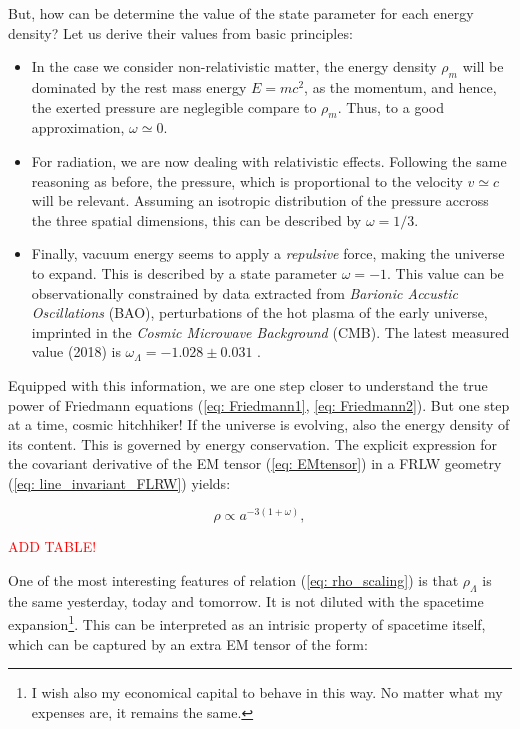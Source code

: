 \documentclass[11pt, a4paper]{article} %
\begin{document}
But, how can be determine the value of the state parameter for each energy density? Let us derive their values from basic principles:

\begin{itemize}
	\item In the case we consider non-relativistic matter, the energy density $\rho_{m}$ will be dominated by the rest mass energy $E = mc^{2}$, as the momentum, and hence, the exerted pressure are neglegible compare to $\rho_{m}$. Thus, to a good approximation, $\omega \simeq 0$.
	\item For radiation, we are now dealing with relativistic effects. Following the same reasoning as before, the pressure, which is proportional to the velocity $v \simeq c$ will be relevant. Assuming an isotropic distribution of the pressure accross the three spatial dimensions, this can be described by $\omega = 1/3$.
	\item Finally, vacuum energy seems to apply a \textit{repulsive} force, making the universe to expand. This is described by a state parameter $\omega = - 1$. This value can be observationally constrained by data extracted from \textit{Barionic Accustic Oscillations} (BAO), perturbations of the hot plasma of the early universe, imprinted in the \textit{Cosmic Microwave Background} (CMB). The latest measured value (2018) is $\omega_{\Lambda} = -1.028 \pm 0.031$ \cite{2020planck}.
\end{itemize}

Equipped with this information, we are one step closer to understand the true power of Friedmann equations (\ref{eq: Friedmann1}, \ref{eq: Friedmann2}). But one step at a time, cosmic hitchhiker! If the universe is evolving, also the energy density of its content. This is governed by energy conservation. The explicit expression for the covariant derivative of the EM tensor (\ref{eq: EMtensor}) in a FRLW geometry (\ref{eq: line_invariant_FLRW}) yields:

\begin{equation}\label{eq: rho_scaling}
	\rho \propto a^{-3\left(1+\omega\right)},
\end{equation}

\textcolor{red}{ADD TABLE!}

One of the most interesting features of relation (\ref{eq: rho_scaling}) is that $\rho_{\Lambda}$ is the same yesterday, today and tomorrow. It is not diluted with the spacetime expansion\footnote{I wish also my economical capital to behave in this way. No matter what my expenses are, it remains the same.}. This can be interpreted as an intrisic property of spacetime itself, which can be captured by an extra EM tensor of the form:
\end{document}
